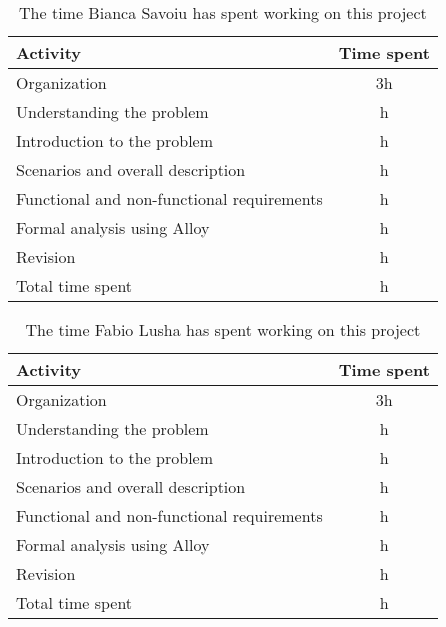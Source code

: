 \label{sec:Effort spent}%
\begin{table}[h!]
    \centering
    \begin{tabular}{|l|c|}
     \hline
     \textbf{Activity} & \textbf{Time spent} \\
    \hline
    Organization & 3h \\
    \hline
    Understanding the problem & h \\
    \hline
    Introduction to the problem & h \\
    \hline
    Scenarios and overall description & h \\
    \hline
    Functional and non-functional requirements & h \\
    \hline
    Formal analysis using Alloy & h \\
    \hline
    Revision & h \\
    \hline
    Total time spent & h \\
    \hline
\end{tabular}
    \caption{The time Bianca Savoiu has spent working on this project}
    \label{tab:Assumptions}
\end{table}


\begin{table}[h!]
    \centering
    \begin{tabular}{|l|c|}
    \hline
     \textbf{Activity} & \textbf{Time spent} \\
    \hline
    Organization & 3h \\
    \hline
    Understanding the problem & h \\
    \hline
    Introduction to the problem & h \\
    \hline
    Scenarios and overall description & h \\
    \hline
    Functional and non-functional requirements & h \\
    \hline
    Formal analysis using Alloy & h \\
    \hline
    Revision & h \\
    \hline
    Total time spent & h \\
    \hline
\end{tabular}
    \caption{The time Fabio Lusha has spent working on this project}
    \label{tab:Assumptions}
\end{table}
